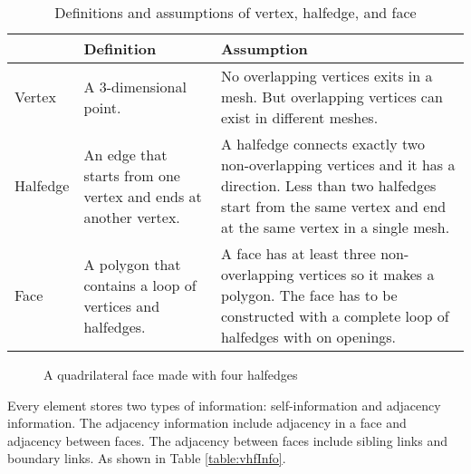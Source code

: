 \documentclass[12pt]{article}
\begin{document}
\begin{table}[h]
\centering
\begin{tabular}{| l | p{} | p{}|}

\hline
		&	Definition	& Assumption	\\
\hline
Vertex	&	A 3-dimensional point.		&	No overlapping vertices exits in a mesh. But overlapping vertices can exist in different meshes.\\
\hline
Halfedge	&	An edge that starts from one vertex and ends at another vertex. & A halfedge connects exactly two non-overlapping vertices and it has a direction. 
Less than two halfedges start from the same vertex and end at the same vertex in a single mesh.\\
\hline
Face		&	A polygon that contains a loop of vertices and halfedges.	& A face has at least three non-overlapping vertices so it makes a polygon. The face has to be constructed with a complete loop of halfedges with on openings.\\
\hline
\end{tabular}
\caption{Definitions and assumptions of vertex, halfedge, and face} 
\label{table:vhfdef}
\end{table}

\begin{figure}[h]
  \centering
  \caption{A quadrilateral face made with four halfedges}
  \label{figure:singleFace}
\end{figure}

Every element stores two types of information: self-information and adjacency information. The adjacency information include adjacency in a face and adjacency between faces. The adjacency between faces include sibling links and boundary links. As shown in Table \ref{table:vhfInfo}. 
\end{document}
